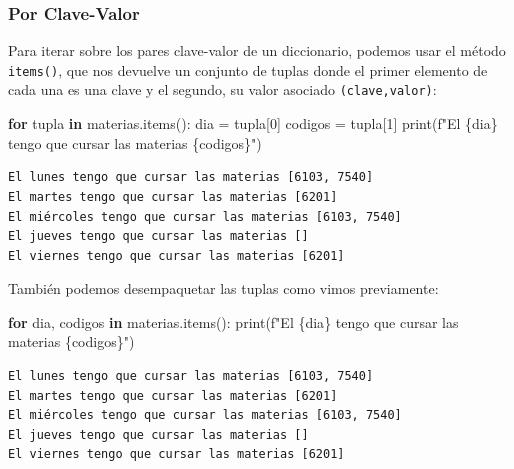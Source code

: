 \documentclass[
  letterpaper,
  DIV=11,
  numbers=noendperiod]{scrreprt}
\newenvironment{Shaded}{\begin{snugshade}}{\end{snugshade}}
\newcommand{\BuiltInTok}[1]{\textcolor[rgb]{0.00,0.23,0.31}{#1}}
\newcommand{\ControlFlowTok}[1]{\textcolor[rgb]{0.00,0.23,0.31}{\textbf{#1}}}
\newcommand{\DecValTok}[1]{\textcolor[rgb]{0.68,0.00,0.00}{#1}}
\newcommand{\KeywordTok}[1]{\textcolor[rgb]{0.00,0.23,0.31}{\textbf{#1}}}
\newcommand{\NormalTok}[1]{\textcolor[rgb]{0.00,0.23,0.31}{#1}}
\newcommand{\OperatorTok}[1]{\textcolor[rgb]{0.37,0.37,0.37}{#1}}
\newcommand{\SpecialCharTok}[1]{\textcolor[rgb]{0.37,0.37,0.37}{#1}}
\newcommand{\SpecialStringTok}[1]{\textcolor[rgb]{0.13,0.47,0.30}{#1}}
\begin{document}
\subsubsection{Por Clave-Valor}\label{por-clave-valor}

Para iterar sobre los pares clave-valor de un diccionario, podemos usar
el método \texttt{items()}, que nos devuelve un conjunto de tuplas donde
el primer elemento de cada una es una clave y el segundo, su valor
asociado \texttt{(clave,valor)}:

\begin{Shaded}
\begin{Highlighting}[]
\ControlFlowTok{for}\NormalTok{ tupla }\KeywordTok{in}\NormalTok{ materias.items():}
\NormalTok{  dia }\OperatorTok{=}\NormalTok{ tupla[}\DecValTok{0}\NormalTok{]}
\NormalTok{  codigos }\OperatorTok{=}\NormalTok{ tupla[}\DecValTok{1}\NormalTok{]}
  \BuiltInTok{print}\NormalTok{(}\SpecialStringTok{f"El }\SpecialCharTok{\{}\NormalTok{dia}\SpecialCharTok{\}}\SpecialStringTok{ tengo que cursar las materias }\SpecialCharTok{\{}\NormalTok{codigos}\SpecialCharTok{\}}\SpecialStringTok{"}\NormalTok{)}
\end{Highlighting}
\end{Shaded}

\begin{verbatim}
El lunes tengo que cursar las materias [6103, 7540]
El martes tengo que cursar las materias [6201]
El miércoles tengo que cursar las materias [6103, 7540]
El jueves tengo que cursar las materias []
El viernes tengo que cursar las materias [6201]
\end{verbatim}

También podemos desempaquetar las tuplas como vimos previamente:

\begin{Shaded}
\begin{Highlighting}[]
\ControlFlowTok{for}\NormalTok{ dia, codigos }\KeywordTok{in}\NormalTok{ materias.items():}
  \BuiltInTok{print}\NormalTok{(}\SpecialStringTok{f"El }\SpecialCharTok{\{}\NormalTok{dia}\SpecialCharTok{\}}\SpecialStringTok{ tengo que cursar las materias }\SpecialCharTok{\{}\NormalTok{codigos}\SpecialCharTok{\}}\SpecialStringTok{"}\NormalTok{)}
\end{Highlighting}
\end{Shaded}

\begin{verbatim}
El lunes tengo que cursar las materias [6103, 7540]
El martes tengo que cursar las materias [6201]
El miércoles tengo que cursar las materias [6103, 7540]
El jueves tengo que cursar las materias []
El viernes tengo que cursar las materias [6201]
\end{verbatim}
\end{document}
